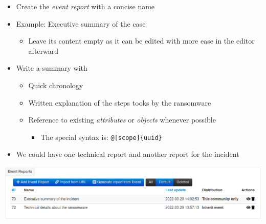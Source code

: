 \begin{frame}
    \begin{itemize}
        \item Create the \textit{event report} with a concise name
        \item Example: Executive summary of the case
        \begin{itemize}
            \item Leave its content empty as it can be edited with more ease in the editor afterward
        \end{itemize}
        \item Write a summary with
        \begin{itemize}
            \item Quick chronology
            \item Written explanation of the steps tooks by the ransomware
            \item Reference to existing \textit{attributes} or \textit{objects} whenever possible
            \begin{itemize}
                \item The special syntax is: \texttt{@[scope]\{uuid\}}
            \end{itemize}
        \end{itemize}
    \end{itemize}
\end{frame}

\begin{frame}
    \begin{itemize}
        \item We could have one technical report and another report for the incident
    \end{itemize}
    \begin{center}
        \includegraphics[width=1.0\linewidth]{pictures/case2/event-report-list.png}
    \end{center}
\end{frame}

